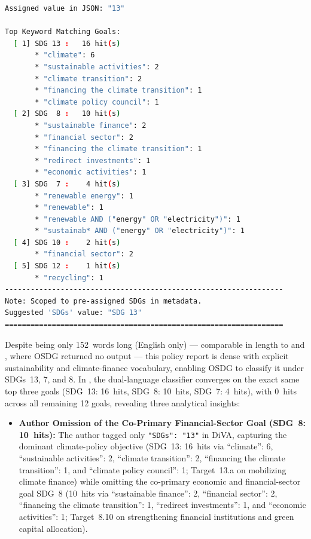 \begin{casestudySection}
\begin{lstlisting}[language={bash}, basicstyle=\footnotesize, escapechar=|, breaklines=true,
    postbreak=\usebox{\lstbreakbox}, caption={Program's output}, label=lst:t_125694Output]
Assigned value in JSON: "13"

Top Keyword Matching Goals:
  [ 1] SDG 13 :   16 hit(s)
       * "climate": 6
       * "sustainable activities": 2
       * "climate transition": 2
       * "financing the climate transition": 1
       * "climate policy council": 1
  [ 2] SDG  8 :   10 hit(s)
       * "sustainable finance": 2
       * "financial sector": 2
       * "financing the climate transition": 1
       * "redirect investments": 1
       * "economic activities": 1
  [ 3] SDG  7 :    4 hit(s)
       * "renewable energy": 1
       * "renewable": 1
       * "renewable AND ("energy" OR "electricity")": 1
       * "sustainab* AND ("energy" OR "electricity")": 1
  [ 4] SDG 10 :    2 hit(s)
       * "financial sector": 2
  [ 5] SDG 12 :    1 hit(s)
       * "recycling": 1
-----------------------------------------------------------------
Note: Scoped to pre-assigned SDGs in metadata.
Suggested 'SDGs' value: "SDG 13"
=================================================================
\end{lstlisting}

Despite being only \num{152}~words long (English only) --- comparable in length to  and , where OSDG returned no output --- this policy report is dense with explicit sustainability and climate-finance vocabulary, enabling OSDG to classify it under \glspl{SDG}~13, 7, and 8. In , the dual-language classifier converges on the exact same top three goals (\gls{SDG}~13: \num{16}~hits, \gls{SDG}~8: \num{10}~hits, \gls{SDG}~7: \num{4}~hits), with \num{0}~hits across all remaining \num{12} goals, revealing three analytical insights:
\begin{itemize}
    \item \textbf{Author Omission of the Co-Primary Financial-Sector Goal (\gls{SDG}~8: \num{10}~hits):} The author tagged only \texttt{"SDGs": "13"} in \gls{DiVA}, capturing the dominant climate-policy objective (\gls{SDG}~13: \num{16}~hits via \enquote{climate}: 6, \enquote{sustainable activities}: 2, \enquote{climate transition}: 2, \enquote{financing the climate transition}: 1, and \enquote{climate policy council}: 1; Target~13.a on mobilizing climate finance) while omitting the co-primary economic and financial-sector goal \gls{SDG}~8 (\num{10}~hits via \enquote{sustainable finance}: 2, \enquote{financial sector}: 2, \enquote{financing the climate transition}: 1, \enquote{redirect investments}: 1, and \enquote{economic activities}: 1; Target~8.10 on strengthening financial institutions and green capital allocation).
    

\end{itemize}
\end{casestudySection}
